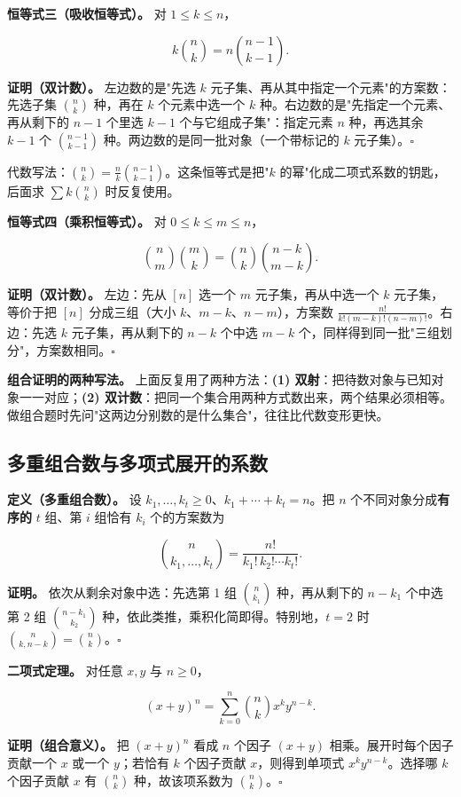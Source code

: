 \textbf{恒等式三（吸收恒等式）。} 对 $1\le k\le n$，

\[
k\binom nk=n\binom{n-1}{k-1}.
\]

\textbf{证明（双计数）。} 左边数的是"先选 $k$ 元子集、再从其中指定一个元素"的方案数：先选子集 $\binom nk$ 种，再在 $k$ 个元素中选一个 $k$ 种。右边数的是"先指定一个元素、再从剩下的 $n-1$ 个里选 $k-1$ 个与它组成子集"：指定元素 $n$ 种，再选其余 $k-1$ 个 $\binom{n-1}{k-1}$ 种。两边数的是同一批对象（一个带标记的 $k$ 元子集）。$\square$

代数写法：$\binom nk=\frac nk\binom{n-1}{k-1}$。这条恒等式是把"$k$ 的幂"化成二项式系数的钥匙，后面求 $\sum k\binom nk$ 时反复使用。

\textbf{恒等式四（乘积恒等式）。} 对 $0\le k\le m\le n$，

\[
\binom nm\binom mk=\binom nk\binom{n-k}{m-k}.
\]

\textbf{证明（双计数）。} 左边：先从 $[n]$ 选一个 $m$ 元子集，再从中选一个 $k$ 元子集，等价于把 $[n]$ 分成三组（大小 $k$、$m-k$、$n-m$），方案数 $\frac{n!}{k!(m-k)!(n-m)!}$。右边：先选 $k$ 元子集，再从剩下的 $n-k$ 个中选 $m-k$ 个，同样得到同一批"三组划分"，方案数相同。$\square$

\textbf{组合证明的两种写法。} 上面反复用了两种方法：\textbf{(1) 双射}：把待数对象与已知对象一一对应；\textbf{(2) 双计数}：把同一个集合用两种方式数出来，两个结果必须相等。做组合题时先问"这两边分别数的是什么集合"，往往比代数变形更快。

\subsection{多重组合数与多项式展开的系数}


\textbf{定义（多重组合数）。} 设 $k_1,\dots,k_t\ge0$、$k_1+\cdots+k_t=n$。把 $n$ 个不同对象分成\textbf{有序的} $t$ 组、第 $i$ 组恰有 $k_i$ 个的方案数为

\[
\binom{n}{k_1,\dots,k_t}=\frac{n!}{k_1!\,k_2!\cdots k_t!}.
\]

\textbf{证明。} 依次从剩余对象中选：先选第 1 组 $\binom n{k_1}$ 种，再从剩下的 $n-k_1$ 个中选第 2 组 $\binom{n-k_1}{k_2}$ 种，依此类推，乘积化简即得。特别地，$t=2$ 时 $\binom{n}{k,n-k}=\binom nk$。$\square$

\textbf{二项式定理。} 对任意 $x,y$ 与 $n\ge0$，

\[
(x+y)^n=\sum_{k=0}^{n}\binom nk x^k y^{n-k}.
\]

\textbf{证明（组合意义）。} 把 $(x+y)^n$ 看成 $n$ 个因子 $(x+y)$ 相乘。展开时每个因子贡献一个 $x$ 或一个 $y$；若恰有 $k$ 个因子贡献 $x$，则得到单项式 $x^ky^{n-k}$。选择哪 $k$ 个因子贡献 $x$ 有 $\binom nk$ 种，故该项系数为 $\binom nk$。$\square$

